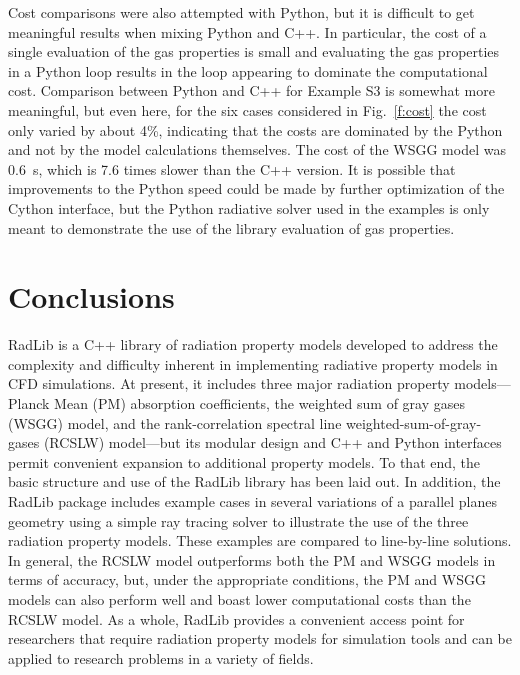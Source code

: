 \documentclass[preprint,12pt]{elsarticle}
\begin{document}
Cost comparisons were also attempted with Python, but it is difficult to get meaningful results when mixing Python and C++. In particular, the cost of a single evaluation of the gas properties is small and evaluating the gas properties in a Python loop results in the loop appearing to dominate the computational cost. Comparison between Python and C++ for Example S3 is somewhat more meaningful, but even here, for the six cases considered in Fig.~\ref{f:cost} the cost only varied by about 4\%, indicating that the costs are dominated by the Python and not by the model calculations themselves. The cost of the WSGG model was 0.6~s, which is 7.6 times slower than the C++ version. It is possible that improvements to the Python speed could be made by further optimization of the Cython interface, but the Python radiative solver used in the examples is only meant to demonstrate the use of the library evaluation of gas properties.


\section{Conclusions} \label{s:conclusions}

RadLib is a C++ library of radiation property models developed to address the complexity and difficulty inherent in implementing radiative property models in CFD simulations. At present, it includes three major radiation property models---Planck Mean (PM) absorption coefficients, the weighted sum of gray gases (WSGG) model, and the rank-correlation spectral line weighted-sum-of-gray-gases (RCSLW) model---but its modular design and C++ and Python interfaces permit convenient expansion to additional property models. To that end, the basic structure and use of the RadLib library has been laid out. In addition, the RadLib package includes example cases in several variations of a parallel planes geometry using a simple ray tracing solver to illustrate the use of the three radiation property models. These examples are compared to line-by-line solutions. In general, the RCSLW model outperforms both the PM and WSGG models in terms of accuracy, but, under the appropriate conditions, the PM and WSGG models can also perform well and boast lower computational costs than the RCSLW model. As a whole, RadLib provides a convenient access point for researchers that require radiation property models for simulation tools and can be applied to research problems in a variety of fields. 
\end{document}
